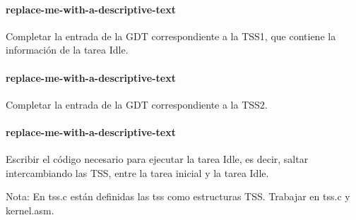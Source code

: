 \paragraph{replace-me-with-a-descriptive-text}\label{subsubsec:ej6-e}
Completar la entrada de la GDT correspondiente a la TSS1, que contiene la
información de la tarea Idle.
\hruler
{}

\paragraph{replace-me-with-a-descriptive-text}\label{subsubsec:ej6-f}
Completar la entrada de la GDT correspondiente a la TSS2.
\hruler
{}

\paragraph{replace-me-with-a-descriptive-text}\label{subsubsec:ej6-g}
Escribir el código necesario para ejecutar la tarea Idle, es decir, saltar
intercambiando las TSS, entre la tarea inicial y la tarea Idle.

Nota: En tss.c están definidas las tss como estructuras TSS. Trabajar en tss.c y
kernel.asm.
\hruler
{}

